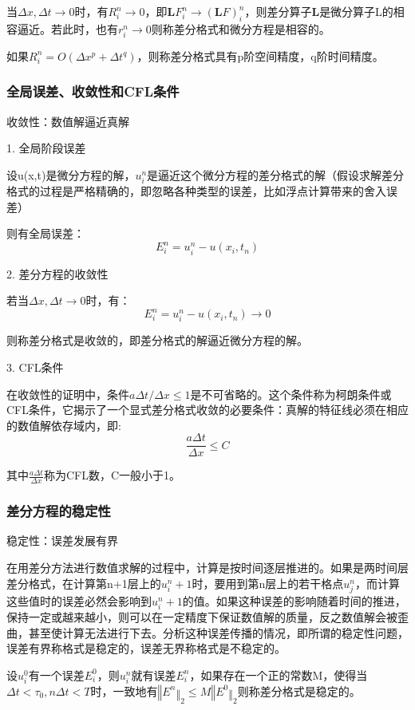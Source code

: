 \documentclass{article}
\begin{document}
当$\Delta x, \Delta t \longrightarrow 0$时，有$R_i^n\longrightarrow0$，即$\mathbf{L}F_i^n\longrightarrow(\mathbf{L}F)_i^n$，则差分算子$\mathbf{L}$是微分算子L的相容逼近。若此时，也有$r_i^n\longrightarrow0$则称差分格式和微分方程是相容的。

如果$R_i^n=O(\Delta x^p + \Delta t^q)$，则称差分格式具有p阶空间精度，q阶时间精度。

\subsubsection{全局误差、收敛性和CFL条件}
收敛性：数值解逼近真解

1. 全局阶段误差

设u(x,t)是微分方程的解，$u_i^n$是逼近这个微分方程的差分格式的解（假设求解差分格式的过程是严格精确的，即忽略各种类型的误差，比如浮点计算带来的舍入误差）

则有全局误差：
$$E_i^n = u^n_i - u(x_i, t_n)$$

2. 差分方程的收敛性

若当$\Delta x,\Delta t\longrightarrow0$时，有：
$$E_i^n = u^n_i - u(x_i, t_n)\longrightarrow0$$

则称差分格式是收敛的，即差分格式的解逼近微分方程的解。

3. CFL条件

在收敛性的证明中，条件$a\Delta t/\Delta x\le1$是不可省略的。这个条件称为柯朗条件或CFL条件，它揭示了一个显式差分格式收敛的必要条件：真解的特征线必须在相应的数值解依存域内，即:
$$\frac{a\Delta t}{\Delta x}\le C$$

其中$\frac{a\Delta t}{\Delta x}$称为CFL数，C一般小于1。

\subsubsection{差分方程的稳定性}
稳定性：误差发展有界

在用差分方法进行数值求解的过程中，计算是按时间逐层推进的。如果是两时间层差分格式，在计算第n+1层上的$u_i^n+1$时，要用到第n层上的若干格点$u_j^n$，而计算这些值时的误差必然会影响到$u_i^n+1$的值。如果这种误差的影响随着时间的推进，保持一定或越来越小，则可以在一定精度下保证数值解的质量，反之数值解会被歪曲，甚至使计算无法进行下去。分析这种误差传播的情况，即所谓的稳定性问题，误差有界称格式是稳定的，误差无界称格式是不稳定的。

设$u_i^0$有一个误差$E_i^0$，则$u_i^n$就有误差$E_i^n$，如果存在一个正的常数M，使得当$\Delta t<\tau_0, n\Delta t<T$时，一致地有$‖E^n‖_2\le M‖E^0‖_2$则称差分格式是稳定的。
\end{document}
